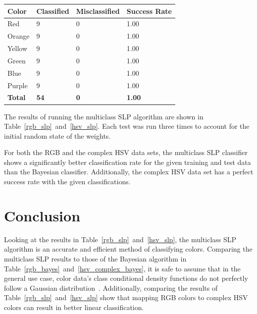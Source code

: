 \documentclass[twoside]{IEEEtran}
\begin{document}
\begin{table}[!t]
\begin{minipage}{\columnwidth}
\begin{tabular}{ l l l l }
            \toprule
            \bfseries Color & \bfseries Classified & \bfseries Misclassified & \bfseries Success Rate \\
            \midrule
            Red             & 9                    & 0                       & 1.00                   \\
            Orange          & 9                    & 0                       & 1.00                   \\
            Yellow          & 9                    & 0                       & 1.00                   \\
            Green           & 9                    & 0                       & 1.00                   \\
            Blue            & 9                    & 0                       & 1.00                   \\
            Purple          & 9                    & 0                       & 1.00                   \\
            \midrule
            \bfseries Total & \bfseries 54         & \bfseries 0             & \bfseries 1.00         \\
            \bottomrule
        \end{tabular}
    \end{minipage}
\end{table}

The results of running the multiclass SLP algorithm are shown in Table~\ref{rgb_slp}~and~\ref{hsv_slp}. Each test was
run three times to account for the initial random state of the weights.

For both the RGB and the complex HSV data sets, the multiclass SLP classifier shows a
significantly better classification rate for the given training and test data than the Bayesian
classifier. Additionally, the complex HSV data set has a perfect success rate with the given
classifications.

\section{Conclusion}

Looking at the results in Table~\ref{rgb_slp}~and~\ref{hsv_slp}, the multiclass SLP algorithm is an accurate and efficient
method of classifying colors. Comparing the multiclass SLP results to those of the Bayesian
algorithm in Table~\ref{rgb_bayes}~and~\ref{hsv_complex_bayes}, it is safe to assume that in the general use case, color data's class
conditional density functions do not perfectly follow a Gaussian distribution~\cite{farmer}. Additionally,
comparing the results of Table~\ref{rgb_slp}~and~\ref{hsv_slp} show that mapping RGB colors to complex HSV
colors can result in better linear classification.
\end{document}

